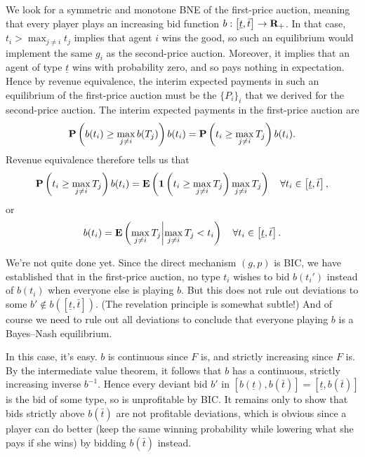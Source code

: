 \documentclass[11pt,letterpaper,reqno,oneside]{article}
\begin{document}
We look for a symmetric and monotone BNE of the first-price auction, meaning that every player plays an increasing bid function $b : \left[ \underline{t}, \bar{t} \right] \to \mathbf{R}_+$. In that case, $t_i > \max_{j \neq i} t_j$ implies that agent $i$ wins the good, so such an equilibrium would implement the same $g_i$ as the second-price auction. Moreover, it implies that an agent of type $\underline{t}$ wins with probability zero, and so pays nothing in expectation. Hence by revenue equivalence, the interim expected payments in such an equilibrium of the first-price auction must be the $\{ P_i \}_i$ that we derived for the second-price auction.
%
The interim expected payments in the first-price auction are 
%
\begin{equation*}
	\mathbf{P}\left( b(t_i) \geq \max_{j \neq i} b(T_j) \right) b(t_i)
	= \mathbf{P}\left( t_i \geq \max_{j \neq i} T_j \right) b(t_i) .
\end{equation*}
%
Revenue equivalence therefore tells us that
%
\begin{equation*}
	\mathbf{P}\left( t_i \geq \max_{j \neq i} T_j \right) b(t_i)
	= \mathbf{E}\left( \boldsymbol{1}\left( t_i \geq \max_{j \neq i} T_j \right) 
	\max_{j \neq i} T_j \right)
	\quad \forall t_i \in \left[ \underline{t}, \bar{t} \right] ,
\end{equation*}
%
or
%
\begin{equation*}
	b(t_i) = \mathbf{E}\left( \max_{j \neq i} T_j \middle| \max_{j \neq i} T_j < t_i \right)
	\quad \forall t_i \in \left[ \underline{t}, \bar{t} \right] .
\end{equation*}

We're not quite done yet. Since the direct mechanism $(g,p)$ is BIC, we have established that in the first-price auction, no type $t_i$ wishes to bid $b(t_i')$ instead of $b(t_i)$ when everyone else is playing $b$. But this does not rule out deviations to some $b' \notin b\left( \left[ \underline{t}, \bar{t} \right] \right)$. (The revelation principle is somewhat subtle!) And of course we need to rule out all deviations to conclude that everyone playing $b$ is a Bayes--Nash equilibrium.

In this case, it's easy. $b$ is continuous since $F$ is, and strictly increasing since $F$ is. By the intermediate value theorem, it follows that $b$ has a continuous, strictly increasing inverse $b^{-1}$. Hence every deviant bid $b'$ in $\left[ b(\underline{t}), b(\bar{t}) \right] = \left[ \underline{t}, b(\bar{t}) \right]$ is the bid of some type, so is unprofitable by BIC. It remains only to show that bids strictly above $b(\bar{t})$ are not profitable deviations, which is obvious since a player can do better (keep the same winning probability while lowering what she pays if she wins) by bidding $b(\bar{t})$ instead.
\end{document}
